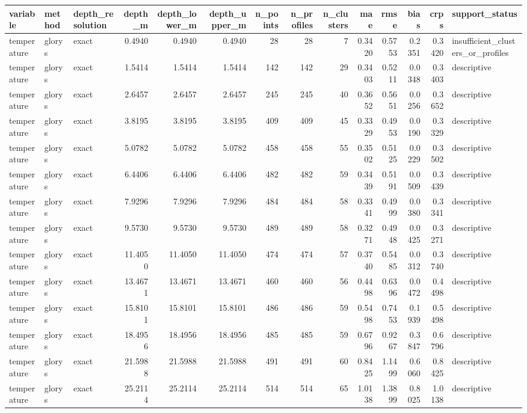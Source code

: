 \begin{tabular}{lllrrrrrrrrrrl}
\toprule
variable & method & depth_resolution & depth_m & depth_lower_m & depth_upper_m & n_points & n_profiles & n_clusters & mae & rmse & bias & crps & support_status \\
\midrule
temperature & glorys & exact & 0.4940 & 0.4940 & 0.4940 & 28 & 28 & 7 & 0.3420 & 0.5753 & 0.2351 & 0.3420 & insufficient_clusters_or_profiles \\
temperature & glorys & exact & 1.5414 & 1.5414 & 1.5414 & 142 & 142 & 29 & 0.3403 & 0.5211 & 0.0348 & 0.3403 & descriptive \\
temperature & glorys & exact & 2.6457 & 2.6457 & 2.6457 & 245 & 245 & 40 & 0.3652 & 0.5651 & 0.0256 & 0.3652 & descriptive \\
temperature & glorys & exact & 3.8195 & 3.8195 & 3.8195 & 409 & 409 & 45 & 0.3329 & 0.4953 & 0.0190 & 0.3329 & descriptive \\
temperature & glorys & exact & 5.0782 & 5.0782 & 5.0782 & 458 & 458 & 55 & 0.3502 & 0.5125 & 0.0229 & 0.3502 & descriptive \\
temperature & glorys & exact & 6.4406 & 6.4406 & 6.4406 & 482 & 482 & 59 & 0.3439 & 0.5191 & 0.0509 & 0.3439 & descriptive \\
temperature & glorys & exact & 7.9296 & 7.9296 & 7.9296 & 484 & 484 & 58 & 0.3341 & 0.4999 & 0.0380 & 0.3341 & descriptive \\
temperature & glorys & exact & 9.5730 & 9.5730 & 9.5730 & 489 & 489 & 58 & 0.3271 & 0.4948 & 0.0425 & 0.3271 & descriptive \\
temperature & glorys & exact & 11.4050 & 11.4050 & 11.4050 & 474 & 474 & 57 & 0.3740 & 0.5485 & 0.0312 & 0.3740 & descriptive \\
temperature & glorys & exact & 13.4671 & 13.4671 & 13.4671 & 460 & 460 & 56 & 0.4498 & 0.6396 & 0.0472 & 0.4498 & descriptive \\
temperature & glorys & exact & 15.8101 & 15.8101 & 15.8101 & 486 & 486 & 59 & 0.5498 & 0.7453 & 0.1939 & 0.5498 & descriptive \\
temperature & glorys & exact & 18.4956 & 18.4956 & 18.4956 & 485 & 485 & 59 & 0.6796 & 0.9267 & 0.3847 & 0.6796 & descriptive \\
temperature & glorys & exact & 21.5988 & 21.5988 & 21.5988 & 491 & 491 & 60 & 0.8425 & 1.1499 & 0.6060 & 0.8425 & descriptive \\
temperature & glorys & exact & 25.2114 & 25.2114 & 25.2114 & 514 & 514 & 65 & 1.0138 & 1.3899 & 0.8025 & 1.0138 & descriptive \\

\end{tabular}
